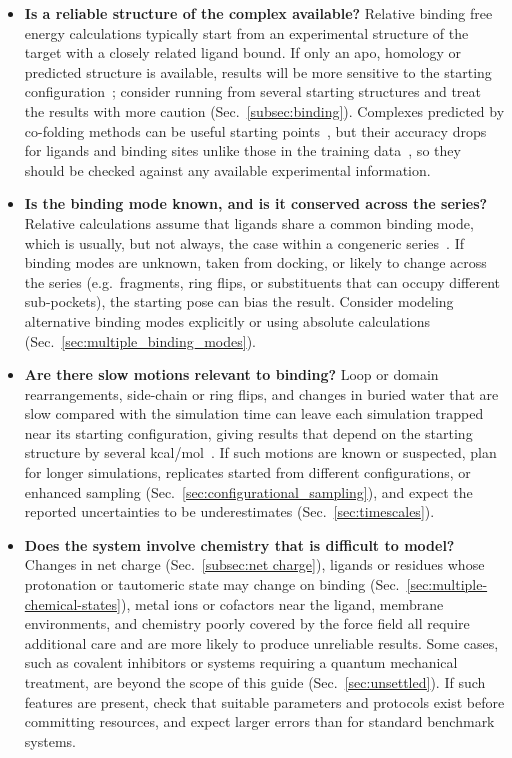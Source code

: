 \documentclass[9pt,bestpractices]{livecoms}
\begin{document}
\begin{itemize}

\item \textbf{Is a reliable structure of the complex available?}
Relative binding free energy calculations typically start from an experimental
structure of the target with a closely related ligand bound. If only an apo,
homology or predicted structure is available, results will be more sensitive
to the starting configuration~\cite{lim2016sensitivity, suruzhon2021sensitivity};
consider running from several starting structures and treat the results with
more caution (Sec.~\ref{subsec:binding}). Complexes predicted by co-folding
methods can be useful starting points~\cite{furui2025helixfold3}, but their accuracy
drops for ligands and binding sites unlike those in the training
data~\cite{skrinjar2026cofolding}, so they should be checked against any
available experimental information.

\item \textbf{Is the binding mode known, and is it conserved across the series?}
Relative calculations assume that ligands share a common binding mode, which is
usually, but not always, the case within a congeneric
series~\cite{wacker2010conserved, brandt2011congeneric}. If binding modes are
unknown, taken from docking, or likely to change across the series (e.g.\
fragments, ring flips, or substituents that can occupy different
sub-pockets), the starting pose can bias the result. Consider modeling
alternative binding modes explicitly or using absolute calculations
(Sec.~\ref{sec:multiple_binding_modes}).

\item \textbf{Are there slow motions relevant to binding?}
Loop or domain rearrangements, side-chain or ring flips, and changes in buried
water that are slow compared with the simulation time can leave each
simulation trapped near its starting configuration, giving results that depend
on the starting structure by several kcal/mol~\cite{lim2016sensitivity,
zhang2023sampling}. If such motions are known or suspected, plan for longer
simulations, replicates started from different configurations, or enhanced
sampling (Sec.~\ref{sec:configurational_sampling}), and expect the reported
uncertainties to be underestimates (Sec.~\ref{sec:timescales}).

\item \textbf{Does the system involve chemistry that is difficult to model?}
Changes in net charge (Sec.~\ref{subsec:net charge}), ligands or residues whose
protonation or tautomeric state may change on binding
(Sec.~\ref{sec:multiple-chemical-states}), metal ions or cofactors near the
ligand, membrane environments, and chemistry poorly covered by the force field
all require additional care and are more likely to produce unreliable results.
Some cases, such as covalent inhibitors or systems requiring a quantum
mechanical treatment, are beyond the scope of this guide
(Sec.~\ref{sec:unsettled}). If such features are present, check that suitable
parameters and protocols exist before committing resources, and expect larger
errors than for standard benchmark systems.


\end{itemize}
\end{document}
